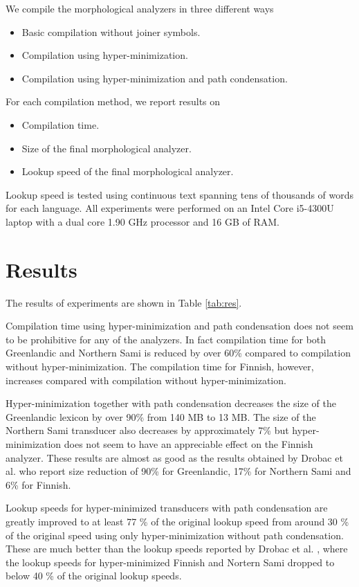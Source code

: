 \documentclass[11pt]{article}
\begin{document}
We compile the morphological analyzers in three different ways

\begin{itemize}
\item Basic compilation without joiner symbols.
\item Compilation using hyper-minimization.
\item Compilation using hyper-minimization and path condensation.
\end{itemize}

For each compilation method, we report results on 

\begin{itemize}
\item Compilation time.
\item Size of the final morphological analyzer.
\item Lookup speed of the final morphological analyzer.
\end{itemize}

Lookup speed is tested using continuous text spanning tens of
thousands of words for each language. All experiments were performed
on an Intel Core i5-4300U laptop with a dual core 1.90 GHz processor
and 16 GB of RAM.

\section{Results}\label{sec:results}

The results of experiments are shown in Table
\ref{tab:res}. 

Compilation time using hyper-minimization and path condensation does
not seem to be prohibitive for any of the analyzers. In fact
compilation time for both Greenlandic and Northern Sami is reduced by
over 60\% compared to compilation without hyper-minimization. The
compilation time for Finnish, however, increases compared with compilation without
hyper-minimization.

Hyper-minimization together with path condensation decreases the size
of the Greenlandic lexicon by over 90\% from 140 MB to 13 MB. The size
of the Northern Sami transducer also decreases by approximately 7\%
but hyper-minimization does not seem to have an appreciable effect on the
Finnish analyzer. These results are almost as good as the results
obtained by Drobac et al.  who report size
reduction of 90\% for Greenlandic, 17\% for Northern Sami and 6\% for
Finnish.

Lookup speeds for hyper-minimized transducers with path condensation
are greatly improved to at least 77 \% of the original lookup speed
from around 30 \% of the original speed using only hyper-minimization
without path condensation. These are much better than the lookup
speeds reported by Drobac et al. , where the
lookup speeds for hyper-minimized Finnish and Nortern Sami dropped to
below 40 \% of the original lookup speeds.
\end{document}
